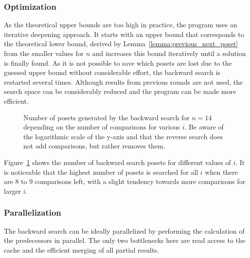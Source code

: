 \documentclass[10pt,journal,compsoc]{IEEEtran}
\begin{document}
\subsubsection{Optimization}

As the theoretical upper bounds are too high in practice, the program uses an iterative deepening approach.
It starts with an upper bound that corresponds to the theoretical lower bound, derived by Lemma~\ref{lemma:previous_next_poset} from the smaller values for $n$ and increases this bound iteratively until a solution is finally found.
As it is not possible to save which posets are lost due to the guessed upper bound without considerable effort, the backward search is restarted several times.
Although results from previous rounds are not used, the search space can be considerably reduced and the program can be made more efficient.

\begin{figure}[!b]
  \centering
  
  \caption{Number of posets generated by the backward search for $n = 14$ depending on the number of comparisons for various $i$. Be aware of the logarithmic scale of the y-axis and that the reverse search does not add comparisons, but rather removes them.}
  \label{fig:backward-posets-per-level}
\end{figure}

Figure~\ref{fig:backward-posets-per-level} shows the number of backward search posets for different values of $i$.
It is noticeable that the highest number of posets is searched for all $i$ when there are $8$ to $9$ comparisons left, with a slight tendency towards more comparisons for larger $i$.


\subsubsection{Parallelization} \label{sec:backward:parallelisation}

The backward search can be ideally parallelized by performing the calculation of the predecessors in parallel.
The only two bottlenecks here are read access to the cache and the efficient merging of all partial results.
\end{document}
